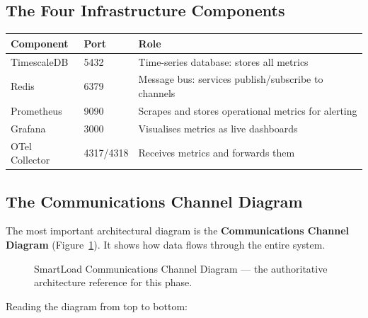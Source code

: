 \documentclass[12pt, a4paper]{article}
\begin{document}
\subsection{The Four Infrastructure Components}

\begin{center}
\begin{tabularx}{\textwidth}{llX}
  \toprule
  \textbf{Component} & \textbf{Port} & \textbf{Role} \\
  \midrule
  TimescaleDB   & 5432 & Time-series database: stores all metrics \\
  Redis         & 6379 & Message bus: services publish/subscribe to channels \\
  Prometheus    & 9090 & Scrapes and stores operational metrics for alerting \\
  Grafana       & 3000 & Visualises metrics as live dashboards \\
  OTel Collector & 4317/4318 & Receives metrics and forwards them \\
  \bottomrule
\end{tabularx}
\end{center}

\subsection{The Communications Channel Diagram}

The most important architectural diagram is the \textbf{Communications Channel
Diagram} (Figure~\ref{fig:commchannel}). It shows how data flows through the
entire system.

\begin{figure}[H]
  \centering
  \caption{SmartLoad Communications Channel Diagram --- the authoritative
           architecture reference for this phase.}
  \label{fig:commchannel}
\end{figure}

Reading the diagram from top to bottom:
\end{document}
